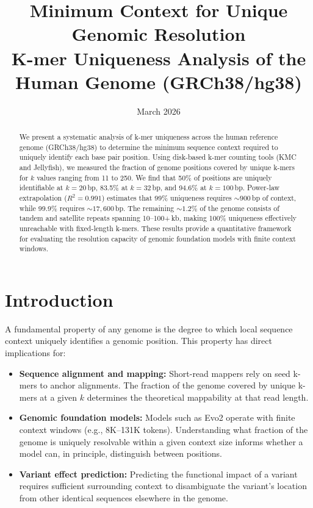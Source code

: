 \documentclass[11pt,a4paper]{article}
\title{\textbf{Minimum Context for Unique Genomic Resolution}\\[0.5em]
\large K-mer Uniqueness Analysis of the Human Genome (GRCh38/hg38)}
\author{}
\date{March 2026}
\begin{document}
\maketitle

\begin{abstract}
We present a systematic analysis of k-mer uniqueness across the human reference genome (GRCh38/hg38) to determine the minimum sequence context required to uniquely identify each base pair position. Using disk-based k-mer counting tools (KMC and Jellyfish), we measured the fraction of genome positions covered by unique k-mers for $k$ values ranging from 11 to 250. We find that 50\% of positions are uniquely identifiable at $k=20$\,bp, 83.5\% at $k=32$\,bp, and 94.6\% at $k=100$\,bp. Power-law extrapolation (${R^2=0.991}$) estimates that 99\% uniqueness requires ${\sim}900$\,bp of context, while 99.9\% requires ${\sim}17{,}600$\,bp. The remaining ${\sim}1.2\%$ of the genome consists of tandem and satellite repeats spanning 10--100+\,kb, making 100\% uniqueness effectively unreachable with fixed-length k-mers. These results provide a quantitative framework for evaluating the resolution capacity of genomic foundation models with finite context windows.
\end{abstract}

\section{Introduction}

A fundamental property of any genome is the degree to which local sequence context uniquely identifies a genomic position. This property has direct implications for:

\begin{itemize}
    \item \textbf{Sequence alignment and mapping:} Short-read mappers rely on seed k-mers to anchor alignments. The fraction of the genome covered by unique k-mers at a given $k$ determines the theoretical mappability at that read length.
    \item \textbf{Genomic foundation models:} Models such as Evo2 operate with finite context windows (e.g., 8K--131K tokens). Understanding what fraction of the genome is uniquely resolvable within a given context size informs whether a model can, in principle, distinguish between positions.
    \item \textbf{Variant effect prediction:} Predicting the functional impact of a variant requires sufficient surrounding context to disambiguate the variant's location from other identical sequences elsewhere in the genome.
\end{itemize}
\end{document}

